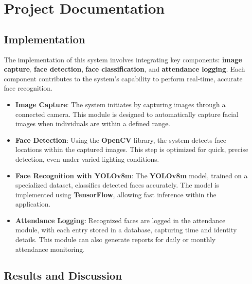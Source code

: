 \chapter{Project Documentation}

\section{Implementation}
The implementation of this system involves integrating key components: \textbf{image capture}, \textbf{face detection}, \textbf{face classification}, and \textbf{attendance logging}. Each component contributes to the system's capability to perform real-time, accurate face recognition.

\begin{itemize}
    \item \textbf{Image Capture}: The system initiates by capturing images through a connected camera. This module is designed to automatically capture facial images when individuals are within a defined range.
    
    \item \textbf{Face Detection}: Using the \textbf{OpenCV} library, the system detects face locations within the captured images. This step is optimized for quick, precise detection, even under varied lighting conditions.
    
    \item \textbf{Face Recognition with YOLOv8m}: The \textbf{YOLOv8m} model, trained on a specialized dataset, classifies detected faces accurately. The model is implemented using \textbf{TensorFlow}, allowing fast inference within the application.
    
    \item \textbf{Attendance Logging}: Recognized faces are logged in the attendance module, with each entry stored in a database, capturing time and identity details. This module can also generate reports for daily or monthly attendance monitoring.
\end{itemize}

\section{Results and Discussion}

